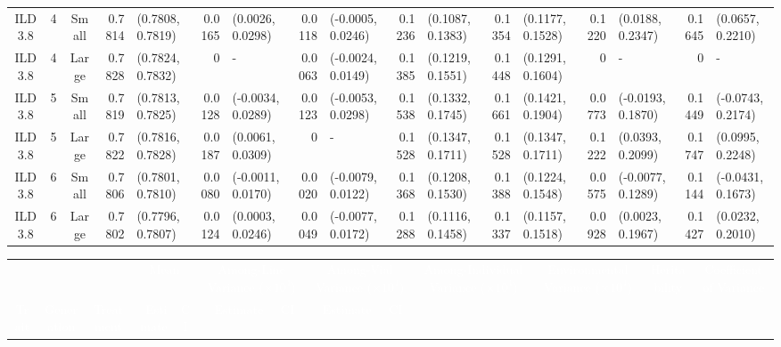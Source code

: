 \begin{landscape}
\begin{table}
\begin{tabular}{cccrlrlrlrlrlrlrl}
ILD3.8	&	4	&	Small	&	0.7814	&	(0.7808, 0.7819)	&	0.0165	&	(0.0026, 0.0298)	&	0.0118	&	(-0.0005, 0.0246)	&	0.1236	&	(0.1087, 0.1383)	&	0.1354	&	(0.1177, 0.1528)	&	0.1220	&	(0.0188, 0.2347)	&	0.1645	&	(0.0657, 0.2210)	\\
ILD3.8	&	4	&	Large	&	0.7828	&	(0.7824, 0.7832)	&	0	&	-	&	0.0063	&	(-0.0024, 0.0149)	&	0.1385	&	(0.1219, 0.1551)	&	0.1448	&	(0.1291, 0.1604)	&	0	&	-	&	0	&	-	\\
ILD3.8	&	5	&	Small	&	0.7819	&	(0.7813, 0.7825)	&	0.0128	&	(-0.0034, 0.0289)	&	0.0123	&	(-0.0053, 0.0298)	&	0.1538	&	(0.1332, 0.1745)	&	0.1661	&	(0.1421, 0.1904)	&	0.0773	&	(-0.0193, 0.1870)	&	0.1449	&	(-0.0743, 0.2174)	\\
ILD3.8	&	5	&	Large	&	0.7822	&	(0.7816, 0.7828)	&	0.0187	&	(0.0061, 0.0309)	&	0	&	-	&	0.1528	&	(0.1347, 0.1711)	&	0.1528	&	(0.1347, 0.1711)	&	0.1222	&	(0.0393, 0.2099)	&	0.1747	&	(0.0995, 0.2248)	\\
ILD3.8	&	6	&	Small	&	0.7806	&	(0.7801, 0.7810)	&	0.0080	&	(-0.0011, 0.0170)	&	0.0020	&	(-0.0079, 0.0122)	&	0.1368	&	(0.1208, 0.1530)	&	0.1388	&	(0.1224, 0.1548)	&	0.0575	&	(-0.0077, 0.1289)	&	0.1144	&	(-0.0431, 0.1673)	\\
ILD3.8	&	6	&	Large	&	0.7802	&	(0.7796, 0.7807)	&	0.0124	&	(0.0003, 0.0246)	&	0.0049	&	(-0.0077, 0.0172)	&	0.1288	&	(0.1116, 0.1458)	&	0.1337	&	(0.1157, 0.1518)	&	0.0928	&	(0.0023, 0.1967)	&	0.1427	&	(0.0232, 0.2010)	\\
\end{tabular}
    \end{table}
\begin{table}
\centering
        \setlength\tabcolsep{0.3em}
        \tiny
    \begin{tabular}{cccrlrlrlrlrlrlrl}
        &&&	\multicolumn{2}{c}{\textcolor{white}{Mean}} & \multicolumn{2}{c}{\textcolor{white}{Among-Line Variance ($\times10^4$)}}&	\multicolumn{2}{c}{\textcolor{white}{Among-Vial Variance ($\times10^4$)}}& \multicolumn{2}{c}{\textcolor{white}{Among-Individual Variance ($\times10^4$)}} & \multicolumn{2}{c}{\textcolor{white}{Environmental Variance ($\times10^4$)}} & \multicolumn{2}{c}{\textcolor{white}{Heritability}} & \multicolumn{2}{c}{\textcolor{white}{Coefficient of Variance}}\\
                \textcolor{white}{Trait}	&	\textcolor{white}{Generation}	&	\textcolor{white}{Treatment}	&	\textcolor{white}{Estimate}	&	\multicolumn{1}{c}{\textcolor{white}{CI}}	&	
                \textcolor{white}{Estimate}	&	\multicolumn{1}{c}{\textcolor{white}{CI}}	&	\textcolor{white}{Estimate}	&	\multicolumn{1}{c}{\textcolor{white}{CI}}	&	

\end{tabular}
\end{table}
\end{landscape}
